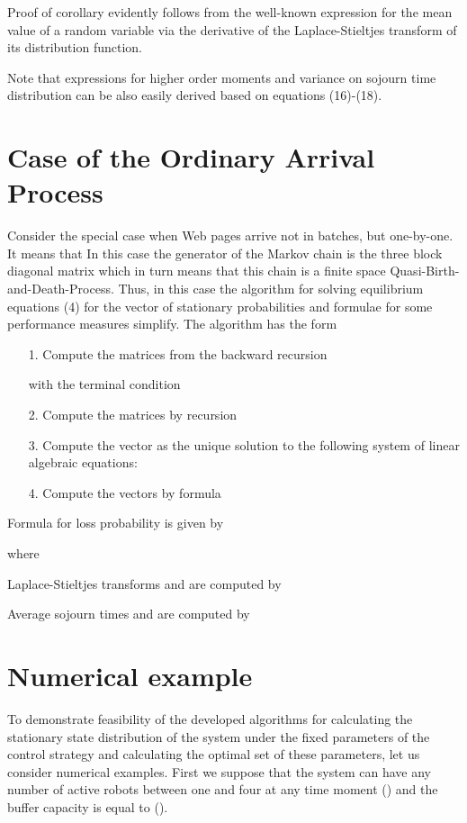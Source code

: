 \documentclass[11pt]{article}
\begin{document}
  

Proof of corollary evidently follows from the well-known expression
for the mean value of a random variable via the derivative of the
Laplace-Stieltjes transform of its distribution function.

Note that expressions for higher order moments and variance on
sojourn time distribution can be also easily derived based on
equations (16)-(18).

\section{Case of the Ordinary Arrival Process}
Consider the special case when Web pages arrive not in batches, but
one-by-one. It means that  In this case  the generator  of the Markov
chain  is the three block diagonal matrix which in turn
means that this chain is a finite space
Quasi-Birth-and-Death-Process. Thus, in this case the algorithm for
solving equilibrium equations (4) for the vector  of
stationary probabilities and formulae for some performance measures
simplify. The algorithm has the form
\begin{itemize}
\item[1.] Compute the matrices  from the
backward recursion

with the terminal condition

\item[2.] Compute the matrices  by recursion

\item[3.] Compute the vector  as the unique solution to the following system
of linear algebraic equations:

\item[4.] Compute the vectors  by
formula

\end{itemize}
Formula for loss probability  is given by

where

Laplace-Stieltjes transforms  and  are
computed by


Average sojourn times    and  are
computed by


\section{Numerical example}

To demonstrate feasibility of the developed algorithms for
calculating the stationary state distribution of the system under
the fixed parameters of the control strategy and calculating the
optimal set of these parameters, let us consider numerical examples.
First we suppose that the system can have any number of active
robots between one and four at any time moment () and the
buffer capacity is equal to  ().
\end{document}
